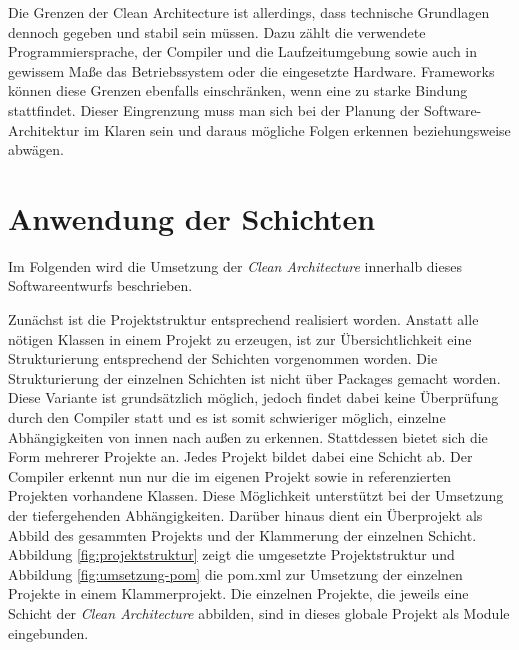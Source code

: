 Die Grenzen der Clean Architecture ist allerdings, dass technische Grundlagen dennoch gegeben und stabil sein müssen.
Dazu zählt die verwendete Programmiersprache, der Compiler und die Laufzeitumgebung sowie auch in gewissem Maße das Betriebssystem oder die eingesetzte Hardware.
Frameworks können diese Grenzen ebenfalls einschränken, wenn eine zu starke Bindung stattfindet.
Dieser Eingrenzung muss man sich bei der Planung der Software-Architektur im Klaren sein und daraus mögliche Folgen erkennen beziehungsweise abwägen.

\section{Anwendung der Schichten}

Im Folgenden wird die Umsetzung der \textit{Clean Architecture} innerhalb dieses Softwareentwurfs beschrieben.

Zunächst ist die Projektstruktur entsprechend realisiert worden.
Anstatt alle nötigen Klassen in einem Projekt zu erzeugen, ist zur Übersichtlichkeit eine Strukturierung entsprechend der Schichten vorgenommen worden.
Die Strukturierung der einzelnen Schichten ist nicht über Packages gemacht worden.
Diese Variante ist grundsätzlich möglich, jedoch findet dabei keine Überprüfung durch den Compiler statt und es ist somit schwieriger möglich, einzelne Abhängigkeiten von innen nach außen zu erkennen.
Stattdessen bietet sich die Form mehrerer Projekte an.
Jedes Projekt bildet dabei eine Schicht ab.
Der Compiler erkennt nun nur die im eigenen Projekt sowie in referenzierten Projekten vorhandene Klassen.
Diese Möglichkeit unterstützt bei der Umsetzung der tiefergehenden Abhängigkeiten.
Darüber hinaus dient ein Überprojekt als Abbild des gesammten Projekts und der Klammerung der einzelnen Schicht.
Abbildung \ref{fig:projektstruktur} zeigt die umgesetzte Projektstruktur und Abbildung \ref{fig:umsetzung-pom} die pom.xml zur Umsetzung der einzelnen Projekte in einem Klammerprojekt.
Die einzelnen Projekte, die jeweils eine Schicht der \textit{Clean Architecture} abbilden, sind in dieses globale Projekt als Module eingebunden.

